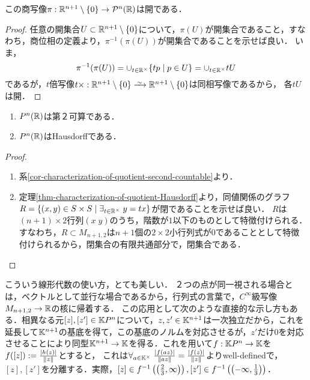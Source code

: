 \documentclass[uplatex,dvipdfmx]{jsreport}
\begin{document}
\begin{lemma}
    この商写像$\pi:\mathbb{R}^{n+1}\setminus\{0\}\to\mathcal{P}^n(\mathbb{R})$は開である．
\end{lemma}
\begin{proof}
    任意の開集合$U\subset\mathbb{R}^{n+1}\setminus\{0\}$について，$\pi(U)$が開集合であること，すなわち，商位相の定義より，$\pi^{-1}(\pi(U))$が開集合であることを示せば良い．
    いま，
    \[\pi^{-1}(\pi(U))=\cup_{t\in\mathbb{R}^\times}\{tp\mid p\in U\}=\cup_{t\in\mathbb{R}^\times}tU\]
    であるが，$t$倍写像$t\times:\R^{n+1}\setminus\{0\}\iso\R^{n+1}\setminus\{0\}$は同相写像であるから，
    各$tU$は開．
\end{proof}

\begin{proposition}\mbox{}
    \begin{enumerate}
        \item $P^n(\mathbb{R})$は第２可算である．
        \item $P^n(\mathbb{R})$はHausdorffである．
    \end{enumerate}
\end{proposition}
\begin{proof}\mbox{}
    \begin{enumerate}
        \item 系\ref{cor-characterization-of-quotient-second-countable}より．
        \item 定理\ref{thm-characterization-of-quotient-Hausdorff}より，同値関係のグラフ$R=\{(x,y)\in S\times S\mid \exists_{t\in\mathbb{R}^\times}\;y=tx\}$が閉であることを示せば良い．
        $R$は$(n+1)\times 2$行列$(x\;y)$のうち，階数が$1$以下のものとして特徴付けられる．すなわち，$R\subset M_{n+1,2}$は$n+1$個の$2\times 2$小行列式が$0$であることとして特徴付けられるから，閉集合の有限共通部分で，閉集合である．
    \end{enumerate}
\end{proof}
\begin{remarks}[核としての分離]
    こういう線形代数の使い方，とても美しい．
    ２つの点が同一視される場合とは，ベクトルとして並行な場合であるから，行列式の言葉で，$C^\infty$級写像$M_{n+1,2}\to\mathbb{R}$の核に帰着する．
    この応用として次のような直接的な示し方もある．相異なる元$[z],[z']\in\mathbb{K} P^n$について，$z,z'\in\mathbb{K}^{n+1}$は一次独立だから，これを延長して$\mathbb{K}^{n+1}$の基底を得て，この基底のノルムを対応させるが，$z'$だけ$0$を対応させることにより同型$\mathbb{K}^{n+1}\to\mathbb{K}$を得る．これを用いて$f:\mathbb{K} P^n\to\mathbb{K}$を$f([z]):=\frac{\lvert h(z)\rvert}{\|z\|}$とすると，
    これは$\forall_{a\in\mathbb{K}^\times}\;\frac{\lvert f(az)\rvert}{\|az\|}=\frac{\lvert f(z)\rvert}{\|z\|}$よりwell-definedで，$[z],[z']$を分離する．実際，$[z]\in f^{-1}\left(\left(\frac{2}{3},\infty\right)\right),[z']\in f^{-1}\left(\left(-\infty,\frac{1}{3}\right)\right)$．
\end{remarks}
\end{document}
